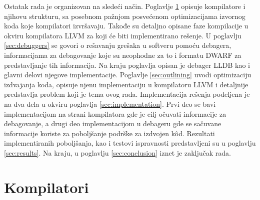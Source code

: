 \documentclass[12pt,oneside]{memoir}
\begin{document}
Ostatak rada je organizovan na sledeći način. %
Poglavlje \ref{sec:compilers} opisuje kompilatore i njihovu strukturu, sa posebnom pažnjom posvećenom optimizacijama izvornog koda koje kompilatori izvršavaju.
Takođe su detaljno opisane faze kompilacije u okviru kompilatora LLVM za koji će biti implementirano rešenje.
U poglavlju \ref{sec:debuggers} se govori o rešavanju grešaka u softveru pomoću debagera, informacijama za debagovanje koje su neophodne za to i formatu DWARF za predstavljanje tih informacija.
Na kraju poglavlja opisan je debager LLDB kao i glavni delovi njegove implementacije.
Poglavlje \ref{sec:outlining} uvodi optimizaciju izdvajanja koda, opisuje njenu implementaciju u kompilatoru LLVM i detaljnije predstavlja problem koji je tema ovog rada.
Implementacija rešenja podeljena je na dva dela u okviru poglavlja \ref{sec:implementation}.
Prvi deo se bavi implementacijom na strani kompilatora gde je cilj očuvati informacije za debagovanje, a drugi deo implementacijom u debageru gde se sačuvane informacije koriste za poboljšanje podrške za izdvojen k\^od.
Rezultati implementiranih poboljšanja, kao i testovi ispravnosti predstavljeni su u poglavlju \ref{sec:results}.
Na kraju, u poglavlju \ref{sec:conclusion} iznet je zaključak rada.


\chapter{Kompilatori}
\label{sec:compilers}


\end{document}
